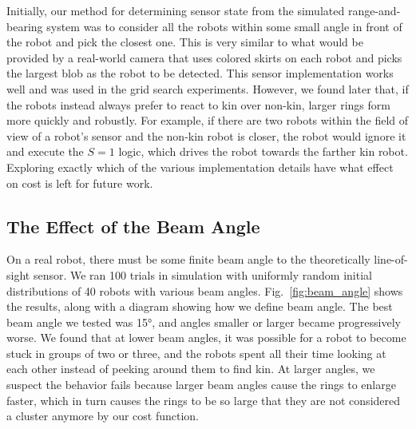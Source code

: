 \documentclass[letterpaper, 10 pt, conference]{ieeeconf}
\begin{document}
Initially, our method for determining sensor state from the simulated
range-and-bearing system was to consider all the robots within some small angle
in front of the robot and pick the closest one. This is very similar to what
would be provided by a real-world camera that uses colored skirts on each robot
and picks the largest blob as the robot to be detected. This sensor
implementation works well and was used in the grid search experiments. However,
we found later that, if the robots instead always prefer to react to kin over
non-kin, larger rings form more quickly and robustly. For example, if there are
two robots within the field of view of a robot's sensor and the non-kin robot is
closer, the robot would ignore it and execute the $S=1$ logic, which drives the
robot towards the farther kin robot. Exploring exactly which of the various
implementation details have what effect on cost is left for future work.

\subsection{The Effect of the Beam Angle} \label{sec:aperture_angle}

On a real robot, there must be some finite beam angle to the theoretically
line-of-sight sensor. We ran 100 trials in simulation with uniformly random
initial distributions of 40 robots with various beam
angles. Fig.~\ref{fig:beam_angle} shows the results, along with a diagram
showing how we define beam angle. The best beam angle we tested was \ang{15},
and angles smaller or larger became progressively worse. We found that at lower
beam angles, it was possible for a robot to become stuck in groups of two or
three, and the robots spent all their time looking at each other instead of
peeking around them to find kin. At larger angles, we suspect the behavior fails
because larger beam angles cause the rings to enlarge faster, which in turn
causes the rings to be so large that they are not considered a cluster anymore
by our cost function.
\end{document}
